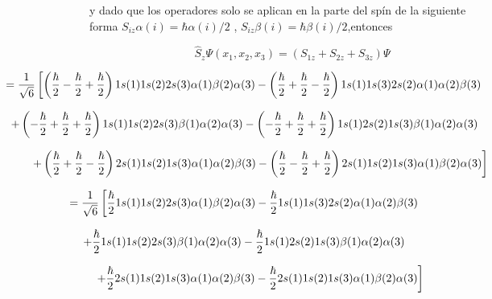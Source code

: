 \documentclass[12pt,a4paper]{article}
\begin{document}
\begin{enumerate}
\begin{enumerate}
    y dado que los operadores solo se aplican en la parte del spín de la siguiente forma $S_{iz} \alpha(i)= \hbar \alpha(i)/2 $ , $S_{iz} \beta(i) = \hbar \beta(i)/2$,entonces
    
    \begin{equation*}
        \hat{S}_z \Psi (x_1,x_2,x_3) =  (S_{1z} + S_{2z} + S_{3z}) \Psi 
    \end{equation*}
    
    \begin{equation*}
        \hspace{-3cm}= \frac{1}{\sqrt{6}} \left[\left(\frac{\hbar}{2} - \frac{\hbar}{2} + \frac{\hbar}{2}\right)1s(1)1s(2)2s(3)\alpha(1)\beta(2)\alpha(3) -\left(\frac{\hbar}{2} + \frac{\hbar}{2} - \frac{\hbar}{2}\right)1s(1)1s(3)2s(2) \alpha(1) \alpha(2) \beta(3) \right.
    \end{equation*}
    
    \begin{equation*}
        \hspace{-3cm}+ \left(-\frac{\hbar}{2} + \frac{\hbar}{2} + \frac{\hbar}{2}\right)1s(1)1s(2) 2s(3)\beta(1) \alpha(2) \alpha(3) - \left(-\frac{\hbar}{2} + \frac{\hbar}{2} + \frac{\hbar}{2}\right)1s(1)2s(2)1s(3) \beta(1) \alpha(2) \alpha(3) 
    \end{equation*}
    
    \begin{equation*}
         \hspace{-2cm}\left. +\left(\frac{\hbar}{2} + \frac{\hbar}{2} - \frac{\hbar}{2}\right) 2s(1)1s(2)1s(3) \alpha(1)\alpha(2) \beta (3) - \left(\frac{\hbar}{2} - \frac{\hbar}{2} + \frac{\hbar}{2}\right)2s(1) 1s(2) 1s(3) \alpha(1) \beta(2) \alpha(3) \right]
    \end{equation*}
    
    \begin{equation*}
        \hspace{-3cm}= \frac{1}{\sqrt{6}} \left[\frac{\hbar}{2}1s(1)1s(2)2s(3)\alpha(1)\beta(2)\alpha(3) -\frac{\hbar}{2}1s(1)1s(3)2s(2) \alpha(1) \alpha(2) \beta(3) \right.
    \end{equation*}
    
    \begin{equation*}
        \hspace{-3cm}+ \frac{\hbar}{2}1s(1)1s(2) 2s(3)\beta(1) \alpha(2) \alpha(3) - \frac{\hbar}{2}1s(1)2s(2)1s(3) \beta(1) \alpha(2) \alpha(3) 
    \end{equation*}
    
    \begin{equation*}
         \hspace{-2cm}\left. +\frac{\hbar}{2} 2s(1)1s(2)1s(3) \alpha(1)\alpha(2) \beta (3) - \frac{\hbar}{2}2s(1) 1s(2) 1s(3) \alpha(1) \beta(2) \alpha(3) \right]
    \end{equation*}
    

\end{enumerate}
\end{enumerate}
\end{document}
